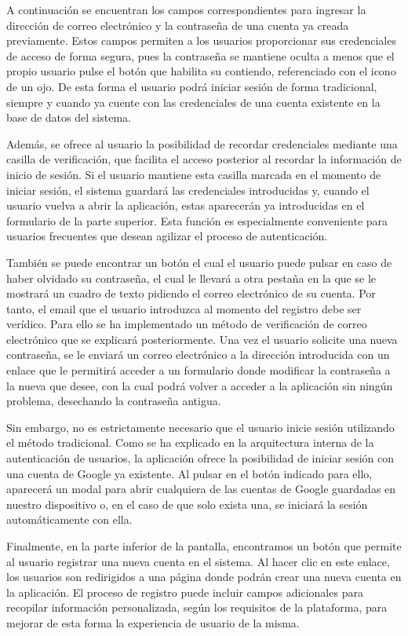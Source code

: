 \documentclass{article}
\begin{document}
A continuación se encuentran los campos correspondientes para ingresar la dirección de correo electrónico y la contraseña de una cuenta ya creada previamente. Estos campos permiten a los usuarios proporcionar sus credenciales de acceso de forma segura, pues la contraseña se mantiene oculta a menos que el propio usuario pulse el botón que habilita su contiendo, referenciado con el icono de un ojo. De esta forma el usuario podrá iniciar sesión de forma tradicional, siempre y cuando ya cuente con las credenciales de una cuenta existente en la base de datos del sistema.

Además, se ofrece al usuario la posibilidad de recordar credenciales mediante una casilla de verificación, que facilita el acceso posterior al recordar la información de inicio de sesión. Si el usuario mantiene esta casilla marcada en el momento de iniciar sesión, el sistema guardará las credenciales introducidas y, cuando el usuario vuelva a abrir la aplicación, estas aparecerán ya introducidas en el formulario de la parte superior. Esta función es especialmente conveniente para usuarios frecuentes que desean agilizar el proceso de autenticación.

También se puede encontrar un botón el cual el usuario puede pulsar en caso de haber olvidado su contraseña, el cual le llevará a otra pestaña en la que se le mostrará un cuadro de texto pidiendo el correo electrónico de su cuenta. Por tanto, el email que el usuario introduzca al momento del registro debe ser verídico. Para ello se ha implementado un método de verificación de correo electrónico que se explicará posteriormente. Una vez el usuario solicite una nueva contraseña, se le enviará un correo electrónico a la dirección introducida con un enlace que le permitirá acceder a un formulario donde modificar la contraseña a la nueva que desee, con la cual podrá volver a acceder a la aplicación sin ningún problema, desechando la contraseña antigua.

Sin embargo, no es estrictamente necesario que el usuario inicie sesión utilizando el método tradicional. Como se ha explicado en la arquitectura interna de la autenticación de usuarios, la aplicación ofrece la posibilidad de iniciar sesión con una cuenta de Google ya existente. Al pulsar en el botón indicado para ello, aparecerá un modal para abrir cualquiera de las cuentas de Google guardadas en nuestro dispositivo o, en el caso de que solo exista una, se iniciará la sesión automáticamente con ella.

Finalmente, en la parte inferior de la pantalla, encontramos un botón que permite al usuario registrar una nueva cuenta en el sistema. Al hacer clic en este enlace, los usuarios son redirigidos a una página donde podrán crear una nueva cuenta en la aplicación. El proceso de registro puede incluir campos adicionales para recopilar información personalizada, según los requisitos de la plataforma, para mejorar de esta forma la experiencia de usuario de la misma.
\end{document}

